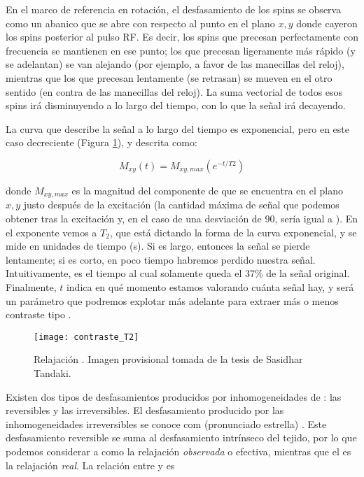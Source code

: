 En el marco de referencia en rotación, el desfasamiento de los spins se observa como un abanico que se abre con respecto al punto en el plano $x,y$ donde cayeron los spins posterior al pulso RF. Es decir, los spins que precesan perfectamente con frecuencia \omegazero se mantienen en ese punto; los que precesan ligeramente más rápido (y se adelantan) se van alejando (por ejemplo, a favor de las manecillas del reloj), mientras que los que precesan lentamente (se retrasan) se mueven en el otro sentido (en contra de las manecillas del reloj). La suma vectorial de todos esos spins irá disminuyendo a lo largo del tiempo, con lo que la señal irá decayendo.


La curva que describe la señal a lo largo del tiempo es exponencial, pero en este caso decreciente (Figura \ref{fig:T2}), y descrita como:

\begin{equation}
\label{eq:T2}
 M_{xy}(t) = M_{xy,max} (e^{-t/T2})
\end{equation}

donde $M_{xy,max}$ es la magnitud del componente de \M que se encuentra en el plano $x,y$ justo después de la excitación (la cantidad máxima de señal que podemos obtener tras la excitación y, en el caso de una desviación de 90\degrees, sería igual a \M). En el exponente vemos a $T_2$, que está dictando la forma de la curva exponencial, y se mide en unidades de tiempo (s). Si \Ttwo es largo, entonces la señal se pierde lentamente; si es corto, en poco tiempo habremos perdido nuestra señal. Intuitivamente, \Ttwo es el tiempo al cual solamente queda el 37\% de la señal \Mxy original. Finalmente, $t$ indica en qué momento estamos valorando cuánta señal hay, y será un parámetro que podremos explotar más adelante para extraer más o menos contraste tipo \Ttwo. 

\begin{figure}[htb]
\begin{figg}
   \texttt{[image: contraste\_T2]}
   \caption{Relajación \Ttwo. Imagen provisional tomada de la tesis de Sasidhar Tandaki. \citep{tadanki2018}}
 \label{fig:T2}
 \end{figg}
\end{figure}


Existen dos tipos de desfasamientos producidos por inhomogeneidades de \Bzero: las reversibles y las irreversibles. El desfasamiento producido por las inhomogeneidades irreversibles se conoce com \Ttwostar (pronunciado \Ttwo estrella) . Este desfasamiento reversible se suma al desfasamiento intrínseco del tejido, por lo que podemos considerar a \Ttwostar como la relajación \textit{observada} o efectiva, mientras que el \Ttwo es la relajación \textit{real}. La relación entre \Ttwo y \Ttwostar es

